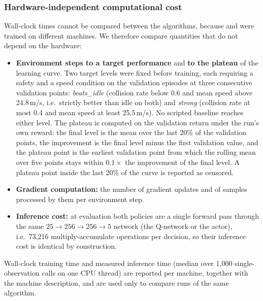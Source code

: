 \subsubsection{Hardware-independent computational cost}
Wall-clock times cannot be compared between the algorithms, because \ddqn{} and \ppo{} were trained on different
machines. We therefore compare quantities that do not depend on the hardware:
\begin{itemize}
  \item \textbf{Environment steps to a target performance} and \textbf{to the plateau} of the learning curve. Two
        target levels were fixed before training, each requiring a safety and a speed condition on the validation
        episodes at three consecutive validation points: \emph{beats\_idle} (collision rate below 0.6 and mean speed
        above 24.8\,m/s, i.e.\ strictly better than idle on both) and \emph{strong} (collision rate at most 0.4 and
        mean speed at least 25.5\,m/s). No scripted baseline reaches either level. The plateau is computed on the
        validation return under the run's own reward: the final level is the mean over the last 20\% of the
        validation points, the improvement is the final level minus the first validation value, and the plateau point
        is the earliest validation point from which the rolling mean over five points stays within $0.1 \times$ the
        improvement of the final level. A plateau point inside the last 20\% of the curve is reported as censored.
  \item \textbf{Gradient computation:} the number of gradient updates and of samples processed by them per
        environment step.
  \item \textbf{Inference cost:} at evaluation both policies are a single forward pass through the same
        $25 \to 256 \to 256 \to 5$ network (the \ddqn{} Q-network or the \ppo{} actor), i.e.\ 73,216
        multiply-accumulate operations per decision, so their inference cost is identical by construction.
\end{itemize}
Wall-clock training time and measured inference time (median over 1,000 single-observation calls on one CPU thread)
are reported per machine, together with the machine description, and are used only to compare runs of the same
algorithm.


